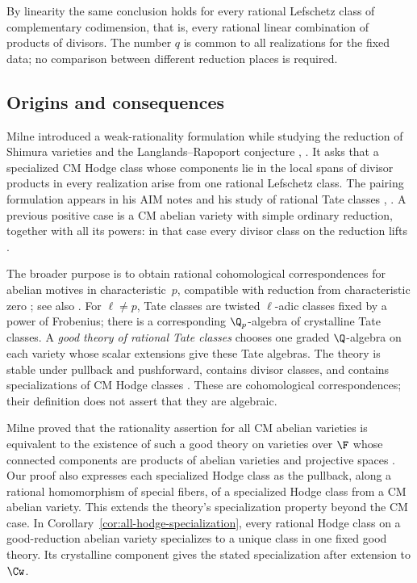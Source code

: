 By linearity the same conclusion holds for every rational Lefschetz class
of complementary codimension, that is, every rational linear combination
of products of divisors. The number \(q\) is common to all realizations
for the fixed data; no comparison between different reduction places is
required.

\subsection{Origins and consequences}

Milne introduced a weak-rationality formulation while studying the
reduction of Shimura varieties and the Langlands--Rapoport conjecture
\cite[Conjecture~6.1(A)]{Milne2000}, \cite[Section~6]{Milne2009LR}. It asks that a specialized CM
Hodge class whose components lie in the local spans of divisor products
in every realization arise from one rational Lefschetz class.
The pairing formulation appears in his
AIM notes and his study of rational Tate classes
\cite[Section~10]{MilneAIM2007}, \cite[Conjecture~4.1]{Milne2009}.
A previous positive case is a CM abelian variety with simple ordinary
reduction, together with all its powers: in that case every divisor
class on the reduction lifts \cite[Example~4.2]{Milne2009}.

The broader purpose is to obtain rational cohomological correspondences
for abelian motives in characteristic~\(p\), compatible with reduction
from characteristic zero \cite[Sections~5--6]{Milne2000}; see also
\cite[Introduction and Section~2]{Milne2025}. For \(\ell\ne p\),
Tate classes are twisted \(\ell\)-adic classes fixed by a power of
Frobenius; there is a corresponding \(\Q_p\)-algebra of crystalline
Tate classes. A \emph{good theory of rational Tate classes} chooses
one graded \(\Q\)-algebra on each variety whose scalar extensions
give these Tate algebras. The theory is stable under pullback and
pushforward, contains divisor classes, and contains specializations of
CM Hodge classes \cite[Definitions~2.1 and~3.1]{Milne2009}.
These are cohomological correspondences; their definition does not
assert that they are algebraic.

Milne proved that the rationality assertion for all CM abelian varieties
is equivalent to the existence of such a good theory on varieties over
\(\F\) whose connected components are products of abelian varieties
and projective spaces \cite[Theorem~4.5]{Milne2009}.
Our proof also expresses each specialized Hodge class as the pullback,
along a rational homomorphism of special fibers, of a specialized Hodge
class from a CM abelian variety. This extends the theory's
specialization property beyond the CM case.
In Corollary~\ref{cor:all-hodge-specialization}, every rational
Hodge class on a good-reduction abelian variety specializes to a unique
class in one fixed good theory. Its crystalline component gives the
stated specialization after extension to \(\Cw\).

